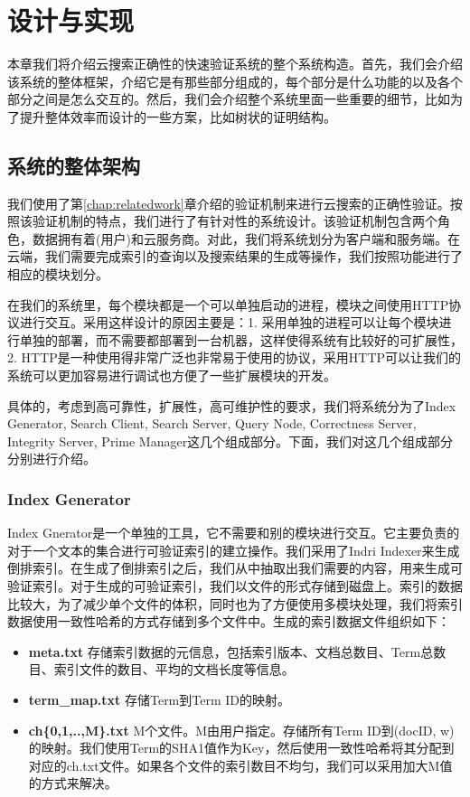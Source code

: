 \chapter{设计与实现}
\label{chap:design}


本章我们将介绍云搜索正确性的快速验证系统的整个系统构造。首先，我们会介绍该系统的整体框架，介绍它是有那些部分组成的，每个部分是什么功能的以及各个部分之间是怎么交互的。然后，我们会介绍整个系统里面一些重要的细节，比如为了提升整体效率而设计的一些方案，比如树状的证明结构。

\section{系统的整体架构}

我们使用了第\ref{chap:relatedwork}章介绍的验证机制来进行云搜索的正确性验证。按照该验证机制的特点，我们进行了有针对性的系统设计。该验证机制包含两个角色，数据拥有着(用户)和云服务商。对此，我们将系统划分为客户端和服务端。在云端，我们需要完成索引的查询以及搜索结果的生成等操作，我们按照功能进行了相应的模块划分。

在我们的系统里，每个模块都是一个可以单独启动的进程，模块之间使用HTTP协议进行交互。采用这样设计的原因主要是：1. 采用单独的进程可以让每个模块进行单独的部署，而不需要都部署到一台机器，这样使得系统有比较好的可扩展性，2. HTTP是一种使用得非常广泛也非常易于使用的协议，采用HTTP可以让我们的系统可以更加容易进行调试也方便了一些扩展模块的开发。

具体的，考虑到高可靠性，扩展性，高可维护性的要求，我们将系统分为了Index Generator, Search Client, Search Server, Query Node, Correctness Server, Integrity Server, Prime Manager这几个组成部分。下面，我们对这几个组成部分分别进行介绍。


\subsection{Index Generator}
Index Gnerator是一个单独的工具，它不需要和别的模块进行交互。它主要负责的对于一个文本的集合进行可验证索引的建立操作。我们采用了Indri Indexer\cite{Indri}来生成倒排索引。在生成了倒排索引之后，我们从中抽取出我们需要的内容，用来生成可验证索引。对于生成的可验证索引，我们以文件的形式存储到磁盘上。索引的数据比较大，为了减少单个文件的体积，同时也为了方便使用多模块处理，我们将索引数据使用一致性哈希的方式存储到多个文件中。生成的索引数据文件组织如下：
\begin{itemize}
\item \textbf{meta.txt} 存储索引数据的元信息，包括索引版本、文档总数目、Term总数目、索引文件的数目、平均的文档长度等信息。
\item \textbf{term\_map.txt} 存储Term到Term ID的映射。
\item \textbf{ch\{0,1,..,M\}.txt} M个文件。M由用户指定。存储所有Term ID到(docID, w)的映射。我们使用Term的SHA1值作为Key，然后使用一致性哈希将其分配到对应的ch.txt文件。如果各个文件的索引数目不均匀，我们可以采用加大M值的方式来解决。
\end{itemize}

